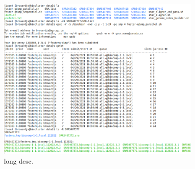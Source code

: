 \begin{figure}
\begin{center}

\includegraphics[width=0.9\textwidth]{misc/SGE_parallel_tasks4.png}
\caption[caption] {long desc.}

\end{center}
\end{figure}


